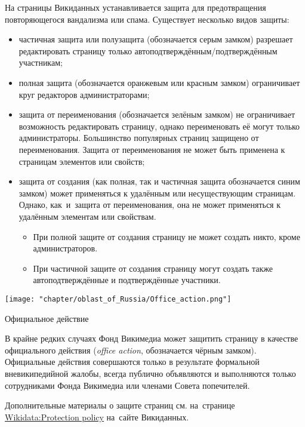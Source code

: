 На страницы Викиданных устанавливается защита 
для предотвращения повторяющегося вандализма или спама. 
Существует несколько видов защиты:
\begin{itemize}
  \item частичная защита или полузащита (обозначается серым замком) разрешает редактировать страницу только автоподтверждённым/подтверждённым участникам;
  \item полная защита (обозначается оранжевым или красным замком) ограничивает круг редакторов администраторами;
  \item защита от переименования (обозначается зелёным замком) не ограничивает возможность редактировать страницу, однако переименовать её могут только администраторы. Большинство популярных страниц защищено от переименования. Защита от переименования не может быть применена к страницам элементов или свойств;
  \item защита от создания (как полная, так и частичная защита обозначается синим замком) может применяться к удалённым или несуществующим страницам. Однако, как~и~защита от переименования, она не может применяться к удалённым элементам или свойствам.
  \begin{itemize}
	\item При полной защите от создания страницу не может создать никто, кроме администраторов.
	\item При частичной защите от создания страницу могут создать также автоподтверждённые и подтверждённые участники.
  \end{itemize}
\end{itemize}



\newpage
\begin{marginfigure}
\texttt{[image: "chapter/oblast\_of\_Russia/Office\_action.png"]}
\caption [Иконка. Официальное действие.]{Официальное действие}%
\end{marginfigure}
%
В крайне редких случаях Фонд Викимедиа может защитить страницу в качестве официального действия (\textit{office action}, обозначается чёрным замком). Официальные действия совершаются только в результате формальной вневикипедийной жалобы, всегда публично объявляются и выполняются только сотрудниками Фонда Викимедиа или членами Совета попечителей.


Дополнительные материалы о защите страниц см. 
на~странице \href{https://www.wikidata.org/wiki/Wikidata:Protection_policy}{Wikidata:Protection policy} 
на~сайте Викиданных.

